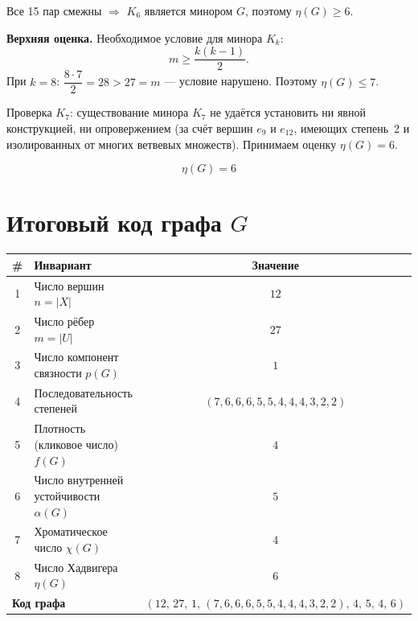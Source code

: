 \documentclass[a4paper,12pt]{article}
\begin{document}
Все 15 пар смежны $\Rightarrow$ $K_6$ является минором $G$, поэтому $\eta(G) \geq 6$.

\textbf{Верхняя оценка.} Необходимое условие для минора $K_k$:
\[
	m \geq \frac{k(k-1)}{2}.
\]
При $k = 8$: $\dfrac{8 \cdot 7}{2} = 28 > 27 = m$ --- условие нарушено.
Поэтому $\eta(G) \leq 7$.

Проверка $K_7$: существование минора $K_7$ не удаётся установить ни явной
конструкцией, ни опровержением (за счёт вершин $e_9$ и $e_{12}$, имеющих
степень~2 и изолированных от многих ветвевых множеств).
Принимаем оценку $\eta(G) = 6$.

\[
	\boxed{\eta(G) = 6}
\]

\section*{Итоговый код графа $G$}

\begin{center}
	\renewcommand{\arraystretch}{1.4}
	\begin{tabular}{|c|l|c|}
		\hline
		\textbf{\#}                              & \textbf{Инвариант}                                                                & \textbf{Значение}           \\
		\hline
		1                                        & Число вершин $n = |X|$                                                            & $12$                        \\
		2                                        & Число рёбер $m = |U|$                                                             & $27$                        \\
		3                                        & Число компонент связности $p(G)$                                                  & $1$                         \\
		4                                        & Последовательность степеней                                                       & $(7,6,6,6,5,5,4,4,4,3,2,2)$ \\
		5                                        & Плотность (кликовое число) $f(G)$                                                 & $4$                         \\
		6                                        & Число внутренней устойчивости $\alpha(G)$                                         & $5$                         \\
		7                                        & Хроматическое число $\chi(G)$                                                     & $4$                         \\
		8                                        & Число Хадвигера $\eta(G)$                                                         & $6$                         \\
		\hline
		\multicolumn{2}{|l|}{\textbf{Код графа}} & $(12,\,27,\,1,\,(7{,}6{,}6{,}6{,}5{,}5{,}4{,}4{,}4{,}3{,}2{,}2),\,4,\,5,\,4,\,6)$                               \\
		\hline
	\end{tabular}
\end{center}
\end{document}

